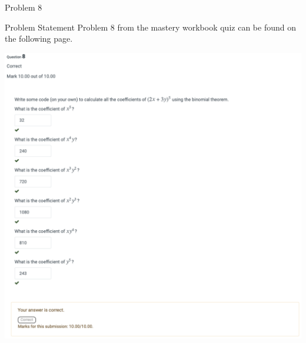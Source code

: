 \begin{problem}{Problem 8}
    \begin{statement}{Problem Statement}
        Problem 8 from the mastery workbook quiz can be found on the following page.
    \end{statement}
    \begin{highlight}[Solution]
        \begin{center}
            \includegraphics[width = 1.0\textwidth]{Images/Problem 8.png}
        \end{center}
    \end{highlight}
\end{problem}

